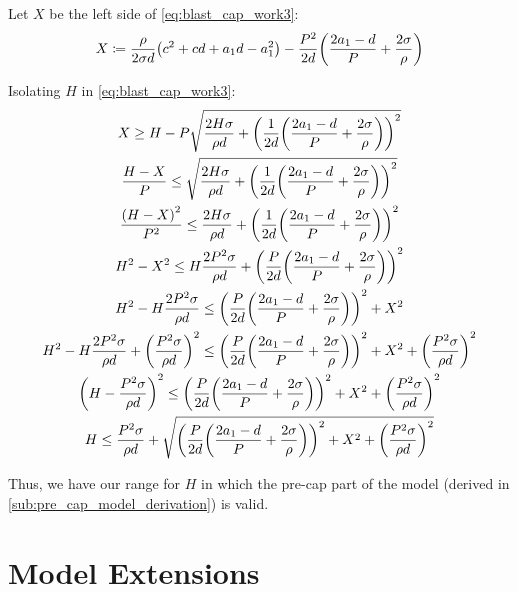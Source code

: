 \documentclass{article}
\begin{document}
Let $X$ be the left side of \eqref{eq:blast_cap_work3}:
\begin{equation}
    X
    \coloneqq
    \frac{\rho}{2 \sigma d} \parens*{c^2 + c d + a_1 d - a_1^2}
    - \frac{P^2}{2d} \parens*{\frac{2 a_1 - d}{P} + \frac{2 \sigma}{\rho}}
\end{equation}

Isolating $H$ in \eqref{eq:blast_cap_work3}:
\begin{gather}
    X
    \ge
    H
    - P \sqrt{
        \frac{2 H \sigma}{\rho d}
        + \parens*{\frac{1}{2d} \parens*{\frac{2 a_1 - d}{P} + \frac{2 \sigma}{\rho}}}^2
    }
    \\
    \frac{H - X}{P} 
    \le
    \sqrt{
        \frac{2 H \sigma}{\rho d}
        + \parens*{\frac{1}{2d} \parens*{\frac{2 a_1 - d}{P} + \frac{2 \sigma}{\rho}}}^2
    }
    \\
    \frac{\parens*{H - X}^2}{P^2} 
    \le
    \frac{2 H \sigma}{\rho d}
    + \parens*{\frac{1}{2d} \parens*{\frac{2 a_1 - d}{P} + \frac{2 \sigma}{\rho}}}^2
    \\
    H^2 - X^2
    \le
    H \frac{2 P^2 \sigma}{\rho d}
    + \parens*{\frac{P}{2d} \parens*{\frac{2 a_1 - d}{P} + \frac{2 \sigma}{\rho}}}^2
    \\
    H^2
    - H \frac{2 P^2 \sigma}{\rho d}
    \le
    \parens*{\frac{P}{2d} \parens*{\frac{2 a_1 - d}{P} + \frac{2 \sigma}{\rho}}}^2
    + X^2
    \\
    H^2
    - H \frac{2 P^2 \sigma}{\rho d}
    + \parens*{\frac{P^2 \sigma}{\rho d}}^2
    \le
    \parens*{\frac{P}{2d} \parens*{\frac{2 a_1 - d}{P} + \frac{2 \sigma}{\rho}}}^2
    + X^2
    + \parens*{\frac{P^2 \sigma}{\rho d}}^2
    \\
    \parens*{H - \frac{P^2 \sigma}{\rho d}}^2
    \le
    \parens*{\frac{P}{2d} \parens*{\frac{2 a_1 - d}{P} + \frac{2 \sigma}{\rho}}}^2
    + X^2
    + \parens*{\frac{P^2 \sigma}{\rho d}}^2
    \\
    H
    \le
    \frac{P^2 \sigma}{\rho d}
    + \sqrt{
        \parens*{\frac{P}{2d} \parens*{\frac{2 a_1 - d}{P} + \frac{2 \sigma}{\rho}}}^2
        + X^2
        + \parens*{\frac{P^2 \sigma}{\rho d}}^2
    }
\end{gather}

Thus, we have our range for $H$ in which the pre-cap part of the model (derived in \autoref{sub:pre_cap_model_derivation}) is valid.


\section{Model Extensions}%
\label{sec:model_extensions}
\end{document}
